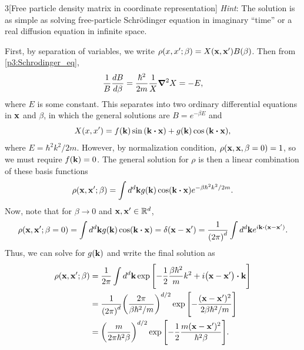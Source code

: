 \documentclass[12pt]{article}
\begin{document}
\begin{problem}{3}[Free particle density matrix in coordinate representation]
\textit{Hint}: The solution is as simple as solving free-particle
Schr\"{o}dinger equation in imaginary ``time'' or a real diffusion equation in
infinite space.
\begin{solution}
First, by separation of variables, we write
$\rho(x,x';\beta)=X(\vb{x},\vb{x}')B(\beta)$. Then from
\eqref{p3:Schrodinger_eq},
\begin{align}
    \frac{1}{B}\frac{dB}{d\beta}=\frac{\hbar^2}{2m}\frac1{X}\grad^2X
    =-E,
\end{align}
where $E$ is some constant. This separates into two ordinary differential
equations in $\vb{x}$ and $\beta$, in which the general solutions are
$B=e^{-\beta E}$ and
\begin{equation}
    X(x,x')=f(\vb{k})\sin\qty(\vb{k}\vdot\vb{x})+
    g(\vb{k})\cos\qty(\vb{k}\vdot\vb{x}),
\end{equation}
where $E=\hbar^2k^2/2m$. However, by normalization condition,
$\rho(\vb{x},\vb{x},\beta=0)=1$, so we must require $f(\vb{k})=0$. The general 
solution for $\rho$ is then a linear combination of these basis functions
\begin{equation}
    \rho(\vb{x},\vb{x}';\beta)
    =\int d^d\vb{k}
        g(\vb{k})\cos(\vb{k}\vdot\vb{x}) e^{-\beta \hbar^2k^2/2m}.
\end{equation}
Now, note that for $\beta\to0$ and $\vb{x},\vb{x}'\in\mathbb{R}^d$,
\begin{equation}
    \rho(\vb{x},\vb{x}';\beta=0)
    =\int d^d\vb{k}g(\vb{k})\cos(\vb{k}\vdot\vb{x})
    =\delta(\vb{x}-\vb{x}')=\frac1{\qty(2\pi)^d}\int
    d^d\vb{k}e^{i\vb{k}\vdot(\vb{x}-\vb{x}')}.
\end{equation}
Thus, we can solve for $g(\vb{k})$ and write the final solution as
\begin{align}
    \rho(\vb{x},\vb{x}';\beta) 
    &=\frac1{2\pi}\int d^d\vb{k}\exp\qty[-\frac12\frac{\beta\hbar^2}{m}k^2
    +i\qty(\vb{x}-\vb{x}')\vdot\vb{k}]\notag\\
    &=\frac1{\qty(2\pi)^d}\qty(\frac{2\pi}{\beta\hbar^2/m})^{d/2}
    \exp\qty[-\frac{(\vb{x}-\vb{x}')^2}{2\beta\hbar^2/m}]\notag\\
    &=\qty(\frac{m}{2\pi\hbar^2\beta})^{d/2}
    \exp\qty[-\frac12\frac{m(\vb{x}-\vb{x}')^2}{\hbar^2\beta}].
\end{align}
\end{solution}


\end{problem}
\end{document}
